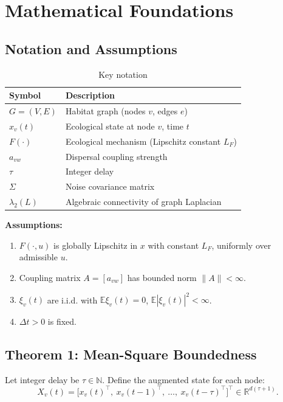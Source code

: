 \documentclass[12pt]{article}
\begin{document}
\section{Mathematical Foundations}
\label{sec:math}

\subsection{Notation and Assumptions}
\label{subsec:assumptions}

\begin{table}[h]
\centering
\caption{Key notation}
\begin{tabular}{ll}
\toprule
Symbol & Description \\
\midrule
$G=(V,E)$ & Habitat graph (nodes $v$, edges $e$) \\
$x_v(t)$ & Ecological state at node $v$, time $t$ \\
$F(\cdot)$ & Ecological mechanism (Lipschitz constant $L_F$) \\
$a_{vw}$ & Dispersal coupling strength \\
$\tau$ & Integer delay \\
$\Sigma$ & Noise covariance matrix \\
$\lambda_2(L)$ & Algebraic connectivity of graph Laplacian \\
\bottomrule
\end{tabular}
\end{table}

\textbf{Assumptions:}
\begin{enumerate}
    \item[A1.] $F(\cdot,u)$ is globally Lipschitz in $x$ with constant $L_F$, uniformly over admissible $u$.
    \item[A2.] Coupling matrix $A=[a_{vw}]$ has bounded norm $\|A\|<\infty$.
    \item[A3.] $\xi_v(t)$ are i.i.d. with $\mathbb{E}\xi_v(t)=0$, $\mathbb{E}|\xi_v(t)|^2<\infty$.
    \item[A4.] $\Delta t>0$ is fixed.
\end{enumerate}

\subsection{Theorem 1: Mean-Square Boundedness}
\label{subsec:theorem1}

Let integer delay be $\tau\in\mathbb{N}$. Define the augmented state for each node:
\begin{equation}
X_v(t)=\big[x_v(t)^\top,\ x_v(t-1)^\top,\ \dots,\ x_v(t-\tau)^\top\big]^\top \in \mathbb{R}^{d(\tau+1)}.
\end{equation}
\end{document}
